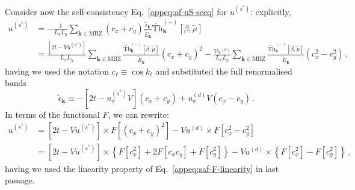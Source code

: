 Consider now the self-consistency Eq.~\eqref{appeq:af-uS-sceq} for $u^{(s^*)}$: explicitly,
\[
\begin{aligned}
	u^{(s^*)} &= -\frac{1}{L_x L_y} \sum_{\mathbf{k}\in\mathrm{MBZ}} (c_x + c_y)
	\frac{\tilde{\epsilon}_\mathbf{k}}{\tilde{E}_\mathbf{k}} \tilde{\mathrm{Th}}_\mathbf{k}^{(-)}[\beta,\tilde{\mu}] \\
	&= \frac{\left[2t - Vu^{(s^*)}\right]}{L_x L_y} \sum_{\mathbf{k}\in\mathrm{MBZ}}
	\frac{ \tilde{\mathrm{Th}}_\mathbf{k}^{(-)}[\beta,\tilde{\mu}]}{\tilde{E}_\mathbf{k}} (c_x + c_y)^2 - \frac{Vu^{(d)}}{L_x L_y} \sum_{\mathbf{k}\in\mathrm{MBZ}}
	\frac{ \tilde{\mathrm{Th}}_\mathbf{k}^{(-)}[\beta,\tilde{\mu}]}{\tilde{E}_\mathbf{k}} (c_x^2 - c_y^2) \, ,
\end{aligned}
\]
having we used the notation $c_\ell \equiv \cos k_\ell$ and substituted the full renormalised bands
\[
	\tilde{\epsilon}_\mathbf{k} \equiv -\left[2t - u^{(s^*)}_\sigma V\right] (c_x + c_y) + u^{(d)}_\sigma V (c_x - c_y) \, .
\]
In terms of the functional $F$, we can rewrite:
\[
\begin{aligned}
	u^{(s^*)} &= \left[2t - Vu^{(s^*)}\right] \times F\left[(c_x + c_y)^2\right] - Vu^{(d)} \times F\left[c_x^2 - c_y^2\right] \\
	&= \left[2t - Vu^{(s^*)}\right] \times \left\lbrace F\left[c_x^2\right] + 2F\left[c_x c_y\right] + F\left[c_y^2\right] \right\rbrace -  Vu^{(d)} \times \left\lbrace F\left[c_x^2\right] - F\left[c_y^2\right] \right\rbrace \, ,
\end{aligned}
\]
having we used the linearity property of Eq.~\eqref{appeq:saf-F-linearity} in last passage.

